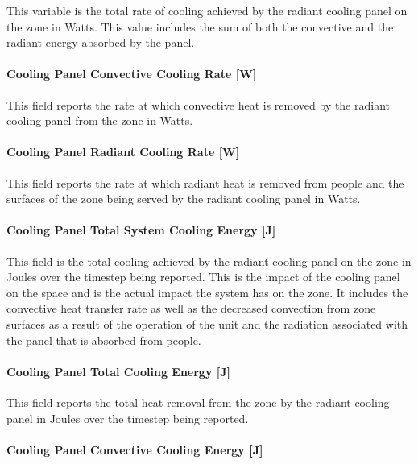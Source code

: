 This variable is the total rate of cooling achieved by the radiant cooling panel on the zone in Watts. This value includes the sum of both the convective and the radiant energy absorbed by the panel.

\paragraph{Cooling Panel Convective Cooling Rate [W]}\label{cooling-panel-convective-cooling-rate-w}

This field reports the rate at which convective heat is removed by the radiant cooling panel from the zone in Watts.

\paragraph{Cooling Panel Radiant Cooling Rate [W]}\label{cooling-panel-radiant-cooling-rate-w}

This field reports the rate at which radiant heat is removed from people and the surfaces of the zone being served by the radiant cooling panel in Watts.

\paragraph{Cooling Panel Total System Cooling Energy [J]}\label{cooling-panel-total-system-cooling-energy-j}

This field is the total cooling achieved by the radiant cooling panel on the zone in Joules over the timestep being reported. This is the impact of the cooling panel on the space and is the actual impact the system has on the zone.  It includes the convective heat transfer rate as well as the decreased convection from zone surfaces as a result of the operation of the unit and the radiation associated with the panel that is absorbed from people.

\paragraph{Cooling Panel Total Cooling Energy [J]}\label{cooling-panel-total-cooling-energy-j}

This field reports the total heat removal from the zone by the radiant cooling panel in Joules over the timestep being reported.

\paragraph{Cooling Panel Convective Cooling Energy [J]}\label{cooling-panel-convective-cooling-energy-j}

